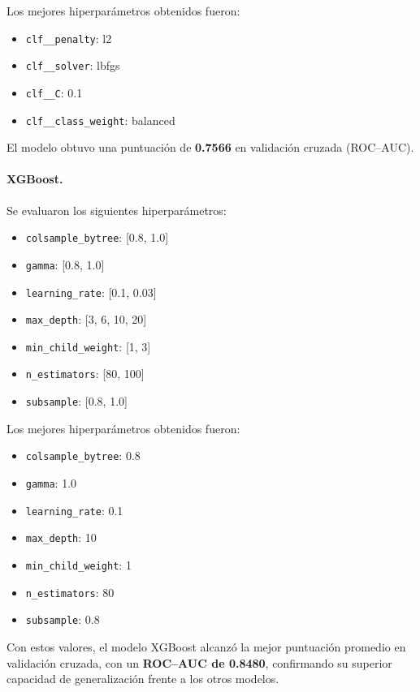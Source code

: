 \documentclass[12pt]{article}
\begin{document}
Los mejores hiperparámetros obtenidos fueron:

\begin{itemize}
    \item \texttt{clf\_\_penalty}: l2
    \item \texttt{clf\_\_solver}: lbfgs
    \item \texttt{clf\_\_C}: 0.1
    \item \texttt{clf\_\_class\_weight}: balanced
\end{itemize}

El modelo obtuvo una puntuación de \textbf{0.7566} en validación cruzada (ROC–AUC).

\paragraph{XGBoost.}
Se evaluaron los siguientes hiperparámetros:

\begin{itemize}
    \item \texttt{colsample\_bytree}: [0.8, 1.0]
    \item \texttt{gamma}: [0.8, 1.0]
    \item \texttt{learning\_rate}: [0.1, 0.03]
    \item \texttt{max\_depth}: [3, 6, 10, 20]
    \item \texttt{min\_child\_weight}: [1, 3]
    \item \texttt{n\_estimators}: [80, 100]
    \item \texttt{subsample}: [0.8, 1.0]
\end{itemize}

Los mejores hiperparámetros obtenidos fueron:

\begin{itemize}
    \item \texttt{colsample\_bytree}: 0.8
    \item \texttt{gamma}: 1.0
    \item \texttt{learning\_rate}: 0.1
    \item \texttt{max\_depth}: 10
    \item \texttt{min\_child\_weight}: 1
    \item \texttt{n\_estimators}: 80
    \item \texttt{subsample}: 0.8
\end{itemize}

Con estos valores, el modelo XGBoost alcanzó la mejor puntuación promedio en validación cruzada, con un \textbf{ROC–AUC de 0.8480}, confirmando su superior capacidad de generalización frente a los otros modelos.
\end{document}
